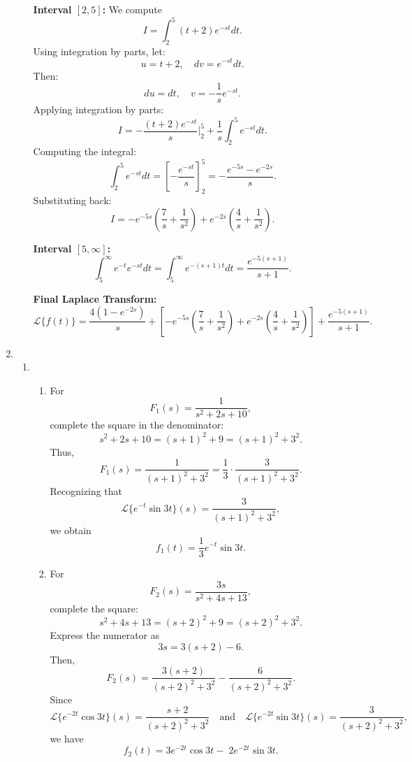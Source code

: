 \documentclass[12pt]{article}
\begin{document}
\begin{enumerate}
\begin{enumerate}
    \textbf{Interval \( [2,5] \):} We compute
    \[
    I = \int_2^5 (t+2) e^{-st} dt.
    \]
    Using integration by parts, let:
    \[
    u = t+2, \quad dv = e^{-st} dt.
    \]
    Then:
    \[
    du = dt, \quad v = -\frac{1}{s} e^{-st}.
    \]
    Applying integration by parts:
    \[
    I = -\frac{(t+2)e^{-st}}{s} \Big|_2^5 + \frac{1}{s} \int_2^5 e^{-st} dt.
    \]
    Computing the integral:
    \[
    \int_2^5 e^{-st} dt = \left[ -\frac{e^{-st}}{s} \right]_2^5 = -\frac{e^{-5s} - e^{-2s}}{s}.
    \]
    Substituting back:
    \[
    I = -e^{-5s} \left(\frac{7}{s} + \frac{1}{s^2}\right) + e^{-2s} \left(\frac{4}{s} + \frac{1}{s^2}\right).
    \]

    \textbf{Interval \( [5,\infty] \):}
    \[
    \int_5^\infty e^{-t} e^{-st} dt = \int_5^\infty e^{-(s+1)t} dt = \frac{e^{-5(s+1)}}{s+1}.
    \]

    \textbf{Final Laplace Transform:}
    \[
    \mathcal{L} \{f(t)\} = \frac{4(1 - e^{-2s})}{s} + \left[-e^{-5s} \left(\frac{7}{s} + \frac{1}{s^2}\right) + e^{-2s} \left(\frac{4}{s} + \frac{1}{s^2}\right)\right] + \frac{e^{-5(s+1)}}{s+1}.
    \]
    \end{enumerate}
    \item 
    \begin{enumerate}
  \item
    \begin{enumerate}
      \item For 
        \[
        F_1(s)=\frac{1}{s^2+2s+10},
        \]
        complete the square in the denominator:
        \[
        s^2+2s+10=(s+1)^2+9=(s+1)^2+3^2.
        \]
        Thus,
        \[
        F_1(s)=\frac{1}{(s+1)^2+3^2}=\frac{1}{3}\cdot\frac{3}{(s+1)^2+3^2}.
        \]
        Recognizing that 
        \[
        \mathcal{L}\{e^{-t}\sin3t\}(s)=\frac{3}{(s+1)^2+3^2},
        \]
        we obtain
        \[
        f_1(t)=\frac{1}{3}e^{-t}\sin3t.
        \]

      \item For 
        \[
        F_2(s)=\frac{3s}{s^2+4s+13},
        \]
        complete the square:
        \[
        s^2+4s+13=(s+2)^2+9=(s+2)^2+3^2.
        \]
        Express the numerator as
        \[
        3s=3(s+2)-6.
        \]
        Then,
        \[
        F_2(s)=\frac{3(s+2)}{(s+2)^2+3^2}-\frac{6}{(s+2)^2+3^2}.
        \]
        Since
        \[
        \mathcal{L}\{e^{-2t}\cos3t\}(s)=\frac{s+2}{(s+2)^2+3^2} \quad \text{and} \quad
        \mathcal{L}\{e^{-2t}\sin3t\}(s)=\frac{3}{(s+2)^2+3^2},
        \]
        we have
        \[
        f_2(t)=3e^{-2t}\cos3t-\;2e^{-2t}\sin3t.
        \]


\end{enumerate}
\end{enumerate}
\end{enumerate}
\end{document}
